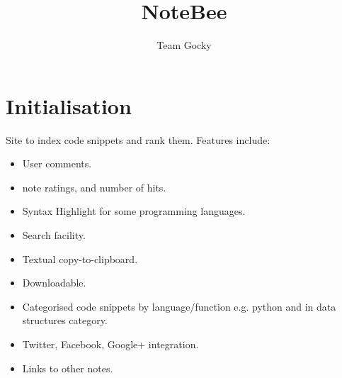 \documentclass[11pt]{article}
\title{NoteBee}
\author{Team Gocky}
\begin{document}
\maketitle

\section{Initialisation}

Site to index code snippets and rank them.
Features include:

\begin{itemize}
\item User comments.
\item note ratings, and number of hits.
\item Syntax Highlight for some programming languages.
\item Search facility.
\item Textual copy-to-clipboard.
\item Downloadable.
\item Categorised code snippets by language/function e.g. python and
in data structures category.
\item Twitter, Facebook, Google+ integration.
\item Links to other notes.
\end{itemize}
\end{document}
